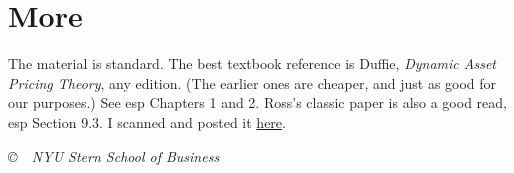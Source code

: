 \documentclass[11pt]{article}
\begin{document}
\section*{More}

The material is standard.
The best textbook reference is Duffie, {\it Dynamic Asset Pricing Theory\/}, any edition.
(The earlier ones are cheaper, and just as good for our purposes.)
See esp Chapters 1 and 2.
Ross's classic paper is also a good read, esp Section 9.3.
I scanned and posted it
\href{http://pages.stern.nyu.edu/~dbackus/233/SteveRoss_risk-arb_chapter_1977.pdf}{here}.

\vfill
{\bigskip \centerline{\it \copyright \ \number\year \
NYU Stern School of Business}
}
\end{document}
